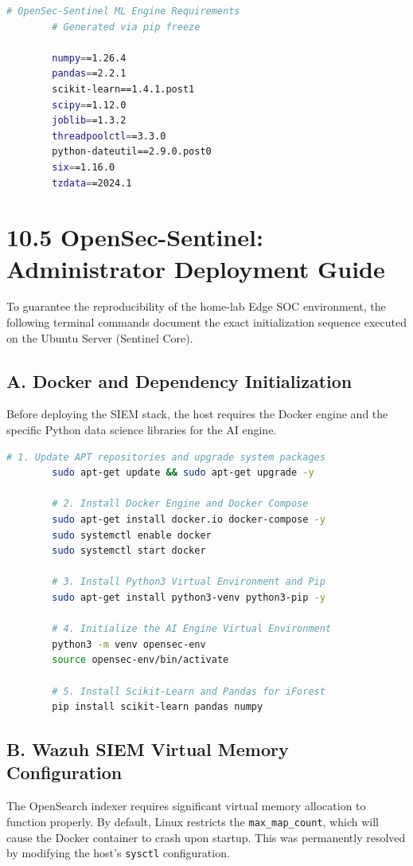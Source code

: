 \documentclass[12pt, a4paper]{report}
\begin{document}
	\begin{lstlisting}[language=bash, caption=Python 3.10 Virtual Environment Dependencies]
		# OpenSec-Sentinel ML Engine Requirements
		# Generated via pip freeze
		
		numpy==1.26.4
		pandas==2.2.1
		scikit-learn==1.4.1.post1
		scipy==1.12.0
		joblib==1.3.2
		threadpoolctl==3.3.0
		python-dateutil==2.9.0.post0
		six==1.16.0
		tzdata==2024.1
	\end{lstlisting}
	
	\section*{10.5 OpenSec-Sentinel: Administrator Deployment Guide}
	To guarantee the reproducibility of the home-lab Edge SOC environment, the following terminal commands document the exact initialization sequence executed on the Ubuntu Server (Sentinel Core).
	
	\subsection*{A. Docker and Dependency Initialization}
	Before deploying the SIEM stack, the host requires the Docker engine and the specific Python data science libraries for the AI engine.
	
	\begin{lstlisting}[language=bash, caption=Host Environment Initialization]
		# 1. Update APT repositories and upgrade system packages
		sudo apt-get update && sudo apt-get upgrade -y
		
		# 2. Install Docker Engine and Docker Compose
		sudo apt-get install docker.io docker-compose -y
		sudo systemctl enable docker
		sudo systemctl start docker
		
		# 3. Install Python3 Virtual Environment and Pip
		sudo apt-get install python3-venv python3-pip -y
		
		# 4. Initialize the AI Engine Virtual Environment
		python3 -m venv opensec-env
		source opensec-env/bin/activate
		
		# 5. Install Scikit-Learn and Pandas for iForest
		pip install scikit-learn pandas numpy
	\end{lstlisting}
	
	\subsection*{B. Wazuh SIEM Virtual Memory Configuration}
	The OpenSearch indexer requires significant virtual memory allocation to function properly. By default, Linux restricts the \texttt{max\_map\_count}, which will cause the Docker container to crash upon startup. This was permanently resolved by modifying the host's \texttt{sysctl} configuration.
	
\end{document}
